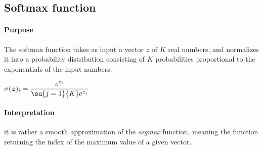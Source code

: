 \subsection{Softmax function}
\paragraph{Purpose}
The softmax function takes as input a vector $z$ of $K$ real numbers, 
and normalizes it into a probability distribution consisting of $K$ 
probabilities proportional to the exponentials of the input numbers.
\begin{center}
    $\sigma(\bm{z})_{i} = \dfrac{e^{z_{i}}}{\su{j=1}{K}e^{z_{j}}}$
\end{center}
\paragraph{Interpretation}
it is rather a smooth approximation of the \emph{argmax} function, 
meaning the function returning the index of the maximum value of a given
vector.



